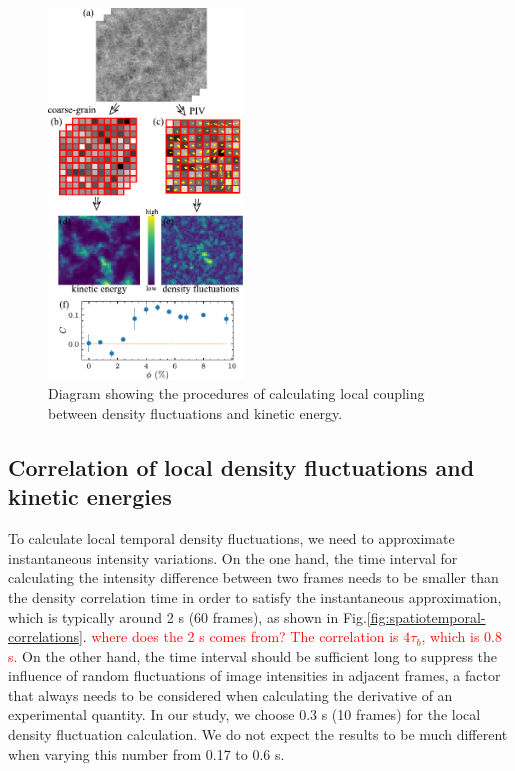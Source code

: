 \documentclass[twocolumn,aps,prx,amsmath,amssymb,longbibliography]{revtex4-2}
\begin{document}
\begin{figure}[t]
	\begin{center}
		\includegraphics[width=0.46\textwidth]{Figures/local-correlation/v1.pdf}
		\caption[Density autocorrelation]
		{
			Diagram showing the procedures of calculating local coupling between density fluctuations and kinetic energy.
		}
		\label{fig:coupling-calculation}
	\end{center}
\end{figure}

\subsection{Correlation of local density fluctuations and kinetic energies}

To calculate local temporal density fluctuations, we need to approximate instantaneous intensity variations. On the one hand, the time interval for calculating the intensity difference between two frames needs to be smaller than the density correlation time in order to satisfy the instantaneous approximation, which is typically around 2 s (60 frames), as shown in Fig.\ref{fig:spatiotemporal-correlations}. \textcolor{red}{where does the 2 s comes from? The correlation is $4\tau_b$, which is 0.8 s.} On the other hand, the time interval should be sufficient long to suppress the influence of random fluctuations of image intensities in adjacent frames, a factor that always needs to be considered when calculating the derivative of an experimental quantity. In our study, we choose 0.3 s (10 frames) for the local density fluctuation calculation. We do not expect the results to be much different when varying this number from 0.17 to 0.6 s.
\end{document}
